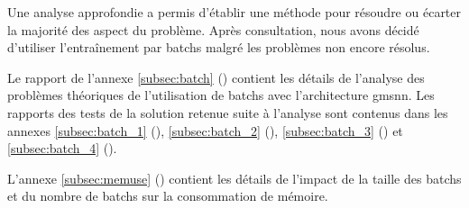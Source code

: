 Une analyse approfondie a permis d'établir une méthode pour résoudre ou écarter la majorité des aspect du problème. Après consultation, nous avons décidé d'utiliser l'entraînement par \glspl{batch} malgré les problèmes non encore résolus.

Le rapport de l'annexe \ref{subsec:batch} () contient les détails de l'analyse des problèmes théoriques de l'utilisation de \glspl{batch} avec l'architecture \gls{gmsnn}. Les rapports des tests de la solution retenue suite à l'analyse sont contenus dans les annexes \ref{subsec:batch_1} (), \ref{subsec:batch_2} (), \ref{subsec:batch_3} () et \ref{subsec:batch_4} ().

L'annexe \ref{subsec:memuse} () contient les détails de l'impact de la taille des \glspl{batch} et du nombre de \glspl{batch} sur la consommation de mémoire.